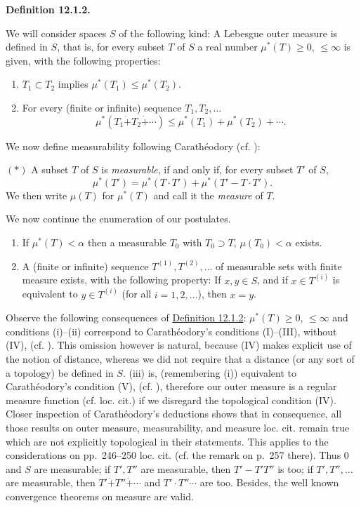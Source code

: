 \documentclass[12pt,b5paper,twoside]{article}
\newcommand{\Definition}[1]{%
  \par\smallskip\noindent\phantomsection\label{def:#1}\textbf{Definition #1.}\enspace
}
\newcommand{\defref}[1]{\hyperref[def:#1]{Definition #1}}
\begin{document}
\Definition{12.1.2}
We will consider spaces $S$ of the following kind: A Lebesgue outer measure is
defined in $S$, that is, for every subset $T$ of $S$ a real number
$\mu^*(T)\geq0$, $\leq\infty$ is given, with the following properties:
\begin{enumerate}[label=(\roman*)]
\item $T_1\subset T_2$ implies $\mu^*(T_1)\leq\mu^*(T_2)$.
\item For every (finite or infinite) sequence $T_1,T_2,\ldots$
  \[
    \mu^*(T_1\mathbin{\dot+}T_2\mathbin{\dot+}\cdots)
    \leq\mu^*(T_1)+\mu^*(T_2)+\cdots.
  \]
\end{enumerate}
We now define measurability following Carath\'eodory
(cf. \cite[p.~246]{ref4}):

\noindent$(*)$ A subset $T$ of $S$ is \emph{measurable}, if and only if, for
every subset $T'$ of $S$,
\[
 \mu^*(T')=\mu^*(T\cdot T')+\mu^*(T'-T\cdot T').
\]
We then write $\mu(T)$ for $\mu^*(T)$ and call it the \emph{measure} of $T$.

We now continue the enumeration of our postulates.
\begin{enumerate}[label=(\roman*),start=3]
\item If $\mu^*(T)<\alpha$ then a measurable $T_0$ with $T_0\supset T$,
  $\mu(T_0)<\alpha$ exists.
\item A (finite or infinite) sequence $T^{(1)},T^{(2)},\ldots$ of measurable
  sets with finite measure exists, with the following property: If $x,y\in S$,
  and if $x\in T^{(i)}$ is equivalent to $y\in T^{(i)}$ (for all
  $i=1,2,\ldots$), then $x=y$.
\end{enumerate}

Observe the following consequences of \defref{12.1.2}: $\mu^*(T)\geq0$,
$\leq\infty$ and conditions (i)--(ii) correspond to Carath\'eodory's
conditions (I)--(III), without (IV), (cf. \cite[pp.~238--239]{ref4}). This
omission however is natural, because (IV) makes explicit use of the notion of
distance, whereas we did not require that a distance (or any sort of a topology)
be defined in $S$. (iii) is, (remembering (i)) equivalent to Carath\'eodory's
condition (V), (cf. \cite[p.~258]{ref4}), therefore our outer measure is a
regular measure function (cf. loc. cit.) if we disregard the topological
condition (IV). Closer inspection of Carath\'eodory's deductions shows that in
consequence, all those results on outer measure, measurability, and measure loc.
cit. remain true which are not explicitly topological in their statements. This
applies to the considerations on pp.~246--250 loc. cit. (cf. the remark on
p.~257 there). Thus $0$ and $S$ are measurable; if $T',T''$ are measurable,
then $T'-T'T''$ is too; if $T',T'',\ldots$ are measurable, then
$T'\mathbin{\dot+}T''\mathbin{\dot+}\cdots$ and
$T'\cdot T''\cdots$ are too. Besides, the well known convergence theorems on
measure are valid.
\end{document}
